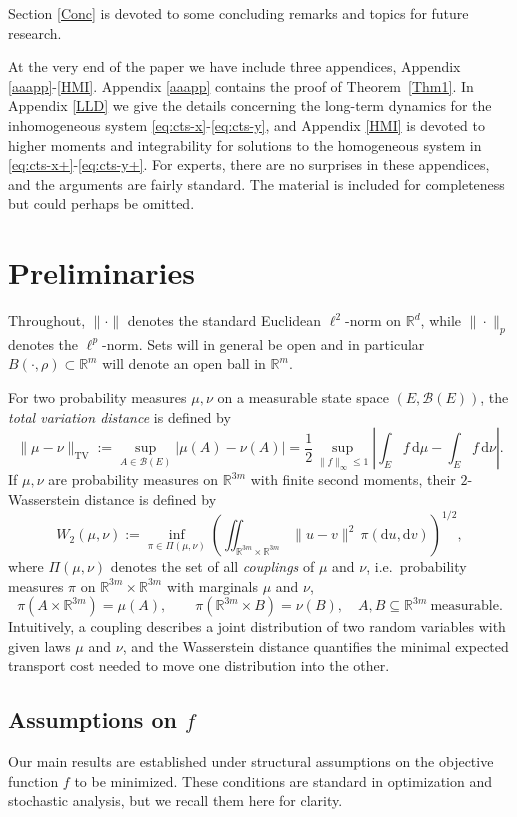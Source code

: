 \documentclass[11pt, a4paper,leqno]{amsart}
\theoremstyle{definition}
\numberwithin{equation}{section}
\newcommand{\R}{\mathbb R}
\begin{document}
 Section \ref{Conc}  is devoted to some concluding remarks and topics for future research.

At the very end of the paper we have include three appendices, Appendix \ref{aaapp}-\ref{HMI}.
Appendix \ref{aaapp} contains the proof of Theorem~\ref{Thm1}. In Appendix \ref{LLD} we give the details concerning the long-term dynamics for the inhomogeneous system \eqref{eq:cts-x}-\eqref{eq:cts-y}, and Appendix \ref{HMI} is devoted to higher moments and integrability for solutions to the homogeneous system in \eqref{eq:cts-x+}-\eqref{eq:cts-y+}. For experts, there are no surprises in these appendices, and the arguments are fairly standard. The material is included for completeness but could perhaps be omitted.




\section{Preliminaries}\label{Prelim}
Throughout, $\|\cdot\|$ denotes the standard Euclidean $\ell^2$-norm on $\mathbb{R}^d$, while $\|\cdot\|_p$ denotes the $\ell^p$-norm. Sets will in general be open and in particular $B(\cdot,\rho)\subset\R^m$ will denote an open ball in $\R^m$.

For two probability measures $\mu,\nu$ on a measurable state space $(E,\mathcal B(E))$, the
\emph{total variation distance} is defined by
\[
\|\mu-\nu\|_{\mathrm{TV}}
:= \sup_{A \in \mathcal B(E)} |\mu(A)-\nu(A)|
= \frac12 \sup_{\|f\|_\infty \le 1} \left| \int_E f \,\mathrm d\mu - \int_E f \,\mathrm d\nu \right|.
\]
If $\mu,\nu$ are probability measures on $\R^{3m}$ with finite second moments, their $2$-Wasserstein distance is defined by
\[
W_2(\mu,\nu)
:= \inf_{\pi \in \Pi(\mu,\nu)}
\left( \iint_{\R^{3m}\times\R^{3m}} \|u-v\|^2 \,\pi(\mathrm{d}u,\mathrm{d}v) \right)^{1/2},
\]
where $\Pi(\mu,\nu)$ denotes the set of all \emph{couplings} of $\mu$ and $\nu$, i.e.\ probability measures
$\pi$ on $\R^{3m}\times\R^{3m}$ with marginals $\mu$ and $\nu$,
\[
\pi(A\times \R^{3m}) = \mu(A), \qquad
\pi(\R^{3m}\times B) = \nu(B),
\quad A,B \subseteq \R^{3m}\ \text{measurable}.
\]
Intuitively, a coupling describes a joint distribution of two random variables with given laws $\mu$ and $\nu$, and the Wasserstein distance quantifies the minimal expected transport cost needed to move one distribution into the other.





\subsection{Assumptions on $f$} \label{Subcond}
Our main results are established under structural assumptions on the objective function $f$ to be minimized. These conditions are standard in optimization and stochastic analysis, but we recall them here for clarity.
\end{document}
